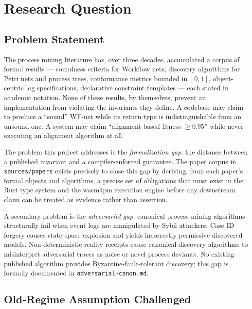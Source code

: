 
\section{Research Question}
\label{sec:sources-papers-rq}

\subsection{Problem Statement}
\label{sec:sources-papers-rq-problem}

The process mining literature has, over three decades, accumulated a corpus of
formal results --- soundness criteria for Workflow nets, discovery algorithms
for Petri nets and process trees, conformance metrics bounded in $[0,1]$,
object-centric log specifications, declarative constraint templates --- each
stated in academic notation. None of these results, by themselves, prevent an
implementation from violating the invariants they define. A codebase may claim
to produce a ``sound'' WF-net while its return type is indistinguishable from
an unsound one. A system may claim ``alignment-based fitness $\geq 0.95$''
while never executing an alignment algorithm at all.

The problem this project addresses is the \emph{formalization gap}: the
distance between a published invariant and a compiler-enforced guarantee. The
paper corpus in \texttt{sources/papers} exists precisely to close this gap by
deriving, from each paper's formal objects and algorithms, a precise set of
obligations that must exist in the Rust type system and the wasm4pm execution
engine before any downstream claim can be treated as evidence rather than
assertion.

A secondary problem is the \emph{adversarial gap}: canonical process mining
algorithms structurally fail when event logs are manipulated by Sybil
attackers. Case ID forgery causes state-space explosion and yields incorrectly
permissive discovered models. Non-deterministic reality receipts cause
canonical discovery algorithms to misinterpret adversarial traces as noise or
novel process deviants. No existing published algorithm provides
Byzantine-fault-tolerant discovery; this gap is formally documented in
\texttt{adversarial-canon.md}.

\subsection{Old-Regime Assumption Challenged}
\label{sec:sources-papers-rq-old-regime}

